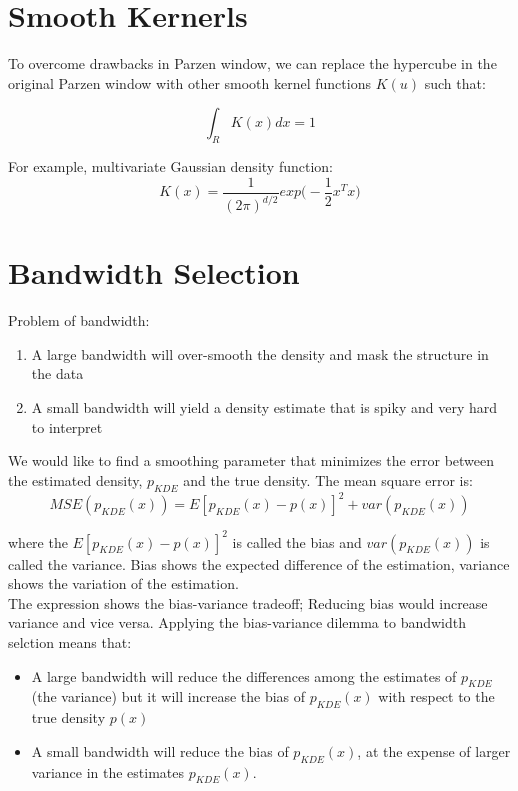 \begin{multicols*}{2}
\section{Smooth Kernerls}

\noindent To overcome drawbacks in Parzen window, we can replace the hypercube in the original Parzen window with other smooth kernel functions $K(u)$ such that:

$$\int_R K(x) dx = 1$$

\noindent For example, multivariate Gaussian density function:
$$K(x)=\frac{1}{(2 \pi)^{d/2}} exp \Big( - \frac{1}{2} x^T x\Big)$$

\section{Bandwidth Selection}

\noindent Problem of bandwidth:
\begin{enumerate}
    \item A large bandwidth will over-smooth the density and mask the structure in the data
    \item A small bandwidth will yield a density estimate that is spiky and very hard to interpret
\end{enumerate}

\noindent We would like to find a smoothing parameter that minimizes the error between the estimated density, $p_{KDE}$ and the true density. The mean square error is:
$$MSE(p_{KDE}(x)) = E[p_{KDE}(x) - p(x)]^2 + var(p_{KDE}(x))$$

\noindent where the $E[p_{KDE}(x) - p(x)]^2$ is called the bias and $var(p_{KDE}(x))$ is called the variance. Bias shows the expected difference of the estimation, variance shows the variation of the estimation. \\

\noindent The expression shows the bias-variance tradeoff; Reducing bias would increase variance and vice versa. Applying the bias-variance dilemma to bandwidth selction means that:
\begin{itemize}
    \item A large bandwidth will reduce the differences among the estimates of $p_{KDE}$ (the variance) but it will increase the bias of $p_{KDE}(x)$ with respect to the true density $p(x)$
    \item A small bandwidth will reduce the bias of $p_{KDE}(x)$, at the expense of larger variance in the estimates $p_{KDE}(x)$.
\end{itemize}


\end{multicols*}

